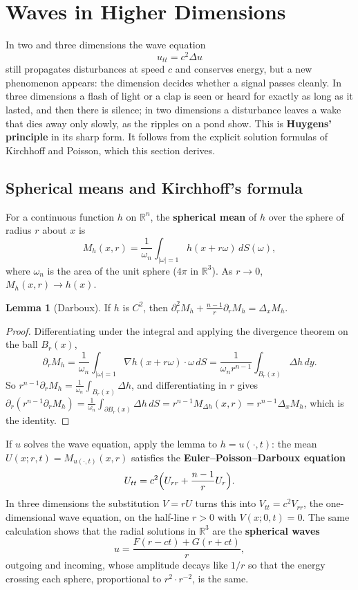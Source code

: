 \documentclass[11pt,a4paper]{article}
\numberwithin{equation}{section}
\theoremstyle{definition}
\newtheorem{lem}[thm]{Lemma}
\begin{document}
\section{Waves in Higher Dimensions}
\label{sec:waveshigher}

In two and three dimensions the wave equation
\[
u_{tt} = c^2\Delta u
\]
still propagates disturbances at speed $c$ and conserves energy, but a new phenomenon appears: the dimension decides whether a signal passes cleanly. In three dimensions a flash of light or a clap is seen or heard for exactly as long as it lasted, and then there is silence; in two
dimensions a disturbance leaves a wake that dies away only slowly, as the ripples on a pond show. This is \textbf{Huygens' principle} in its sharp form. It follows from the explicit solution formulas of Kirchhoff and Poisson, which this section derives.

\subsection{Spherical means and Kirchhoff's formula}
\label{ssec:sphericalmeans}

For a continuous function $h$ on $\mathbb R^n$, the \textbf{spherical mean} of $h$ over the sphere of radius $r$ about $x$ is
\[
M_h(x, r) = \frac{1}{\omega_n}\int_{|\omega| = 1}h(x + r\omega)\,dS(\omega) ,
\]
where $\omega_n$ is the area of the unit sphere ($4\pi$ in $\mathbb R^3$). As $r \to 0$, $M_h(x, r) \to h(x)$.

\begin{lem}[Darboux]
\label{lem:darboux}
If $h$ is $C^2$, then $\partial_r^2M_h + \frac{n - 1}{r}\partial_rM_h = \Delta_xM_h$.
\end{lem}

\begin{proof}
Differentiating under the integral and applying the divergence theorem on the ball $B_r(x)$,
\[
\partial_rM_h = \frac1{\omega_n}\int_{|\omega| = 1}\nabla h(x + r\omega)\cdot\omega\,dS = \frac{1}{\omega_nr^{n - 1}}\int_{B_r(x)}\Delta h\,dy .
\]
So $r^{n - 1}\partial_rM_h = \frac1{\omega_n}\int_{B_r(x)}\Delta h$, and differentiating in $r$ gives $\partial_r(r^{n - 1}\partial_rM_h) = \frac1{\omega_n}\int_{\partial B_r(x)}\Delta h\,dS = r^{n - 1}M_{\Delta h}(x, r) = r^{n - 1}\Delta_xM_h$, which is the identity.
\end{proof}

If $u$ solves the wave equation, apply the lemma to $h = u(\cdot, t)$: the mean $U(x; r, t) = M_{u(\cdot, t)}(x, r)$ satisfies the \textbf{Euler--Poisson--Darboux equation}
\[
U_{tt} = c^2\Bigl(U_{rr} + \frac{n - 1}{r}U_r\Bigr) .
\]
In three dimensions the substitution $V = rU$ turns this into $V_{tt} = c^2V_{rr}$, the one-dimensional wave equation, on the half-line $r > 0$ with $V(x; 0, t) = 0$. The same calculation shows that the radial solutions in $\mathbb R^3$ are the \textbf{spherical waves}
\[
u = \frac{F(r - ct) + G(r + ct)}{r} ,
\]
outgoing and incoming, whose amplitude decays like $1/r$ so that the energy crossing each sphere, proportional to $r^2\cdot r^{-2}$, is the same.
\end{document}

